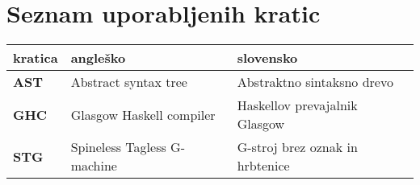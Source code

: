 \chapter*{Seznam uporabljenih kratic}

\begin{tabular}{l|l|l}
  {\bf kratica} & {\bf angleško} & {\bf slovensko} \\ \hline
  {\bf AST} & Abstract syntax tree & Abstraktno sintaksno drevo \\
  {\bf GHC} & Glasgow Haskell compiler & Haskellov prevajalnik Glasgow \\
  {\bf STG} & Spineless Tagless G-machine & G-stroj brez oznak in hrbtenice \\
  
\end{tabular}